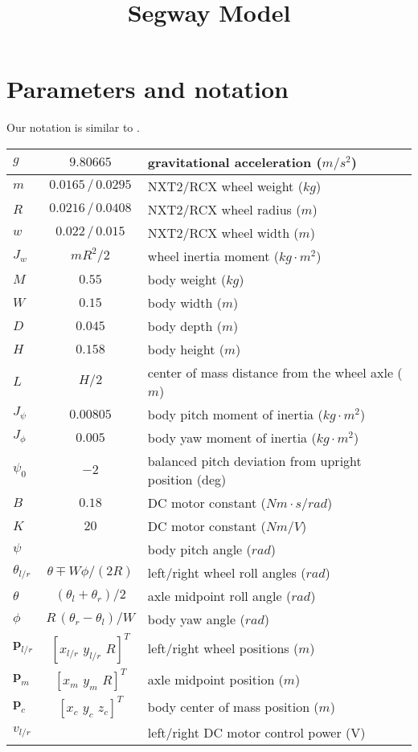\documentclass[a4paper]{article}
\renewcommand{\vec}[1]{\mathbf{#1}} %
\newcommand{\vp}{\vec{p}}
\newcommand{\pitch}{\psi}
\newcommand{\yaw}{\phi}
\newcommand{\roll}{\theta}
\begin{document}
\title{Segway Model}
\maketitle

\section{Parameters and notation}

Our notation is similar to \cite{nxtway-gs}.
\begin{center}
\begin{tabular}{l@{\ =\ }c@{\quad:\quad}l}
    $g$ & $9.80665$ & gravitational acceleration ($m/s^2$) \\
    \hline
    $m$ & $0.0165 \,/\, 0.0295$ & NXT2/RCX wheel weight ($kg$) \\
    $R$ & $0.0216 \,/\, 0.0408$ & NXT2/RCX wheel radius ($m$) \\
    $w$ & $0.022 \,/\, 0.015$ & NXT2/RCX wheel width ($m$) \\
    $J_w$ & $m R^2 / 2$ & wheel inertia moment ($kg \cdot m^2$) \\
    \hline
    $M$ & $0.55$ & body weight ($kg$) \\
    $W$ & $0.15$ & body width ($m$) \\
    $D$ & $0.045$ & body depth ($m$) \\
    $H$ & $0.158$ & body height ($m$) \\
    $L$ & $H/2$ & center of mass distance from the wheel axle ($m$) \\
    $J_\pitch$ & $0.00805$
                & body pitch moment of inertia ($kg \cdot m^2$) \\
    $J_\yaw$ & $0.005$
                    & body yaw moment of inertia ($kg \cdot m^2$) \\
    $\pitch_0$ & $-2$ & balanced pitch deviation from upright position (deg) \\
    \hline
    $B$ & $0.18$ & DC motor constant ($Nm \cdot s/rad$) \\
    $K$ & $20$ & DC motor constant ($Nm / V$) \\
    \hline
    $\pitch$ & & body pitch angle ($rad$) \\
    $\roll_{l/r}$ & $\roll \mp W \yaw / (2 R)$
                        & left/right wheel roll angles ($rad$) \\
    $\roll$ & $(\roll_l + \roll_r)/2$ & axle midpoint roll angle ($rad$) \\
    $\yaw$ & $R \, (\roll_r - \roll_l) / W$ & body yaw angle ($rad$) \\
    $\vp_{l/r}$ & $[x_{l/r} \,\, y_{l/r} \,\, R]^T$
                    & left/right wheel positions ($m$) \\
    $\vp_m$ & $[x_m \,\, y_m \,\, R]^T$ & axle midpoint position ($m$) \\
    $\vp_c$ & $[x_c \,\, y_c \,\, z_c]^T$ 
                    & body center of mass position ($m$) \\
    $v_{l/r}$ & & left/right DC motor control power (V) \\
\end{tabular}
\end{center}
\end{document}
